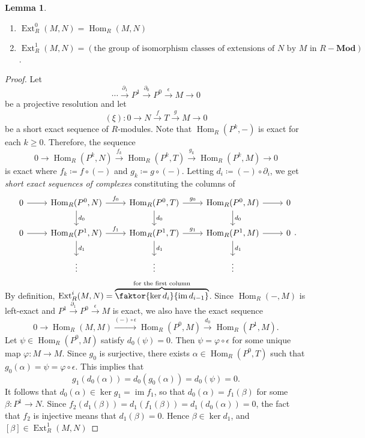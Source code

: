 \documentclass[10pt,letterpaper,cm]{nupset}
\theoremstyle{definition}
\theoremstyle{theorem}
\newtheorem{lemma}[definition]{Lemma}
\theoremstyle{remark}
\newcommand{\1}{\mathbf{1}}
\newcommand{\0}{\vec 0}
\DeclareMathOperator{\ext}{Ext}
\DeclareMathOperator{\im}{im}
\DeclareMathOperator{\Hom}{Hom}
\begin{document}
\begin{lemma} $ $
\begin{enumerate}
\item $\ext^0_R(M, N) = \Hom_R(M, N)$
\item $\ext^1_R(M, N) = \left( \text{the group of isomorphism classes of extensions of } N \text{ by } M\text{ in } R{-}\mathbf{Mod}    \right)$.
\end{enumerate}                                                                                                \end{lemma}
\begin{proof}
Let $$\cdots \overset{\partial_1}{\longrightarrow} P^1 \overset{\partial_0}{\longrightarrow} P^0  \overset{\epsilon}{\longrightarrow} M \to 0$$ be a projective resolution and
let $$\left(\xi\right) : 0 \to N \overset{f}{\longrightarrow} T \overset{g}{\longrightarrow} M \to 0$$ be a short exact sequence of $R$-modules.
Note that $\Hom_R(P^k, -)$ is exact for each $k\geq 0$. Therefore, the sequence $$ 0 \to \Hom_R(P^k, N) \overset{f_k}{\longrightarrow} \Hom_R(P^k, T) \overset{g_k}{\longrightarrow} \Hom_R(P^k, M) \to 0   $$ is exact where $f_k \coloneqq  f\circ (-)$ and $g_k \coloneqq  g \circ (-)$. Letting $d_i \coloneqq  (-)\circ \partial_i$, we get \textit{short exact sequences of complexes} constituting the columns of 
\[
\begin{tikzcd}
0 \arrow[r] & {\Hom_R(P^0, N)} \arrow[r, "f_0"] \arrow[d, "d_0"] & {\Hom_R(P^0, T)} \arrow[r, "g_0"] \arrow[d, "d_0"] & {\Hom_R(P^0, M)} \arrow[r] \arrow[d, "d_0"] & 0 \\
0 \arrow[r] & {\Hom_R(P^1, N)} \arrow[r, "f_1"] \arrow[d, "d_1"] & {\Hom_R(P^1, T)} \arrow[r, "g_1"] \arrow[d, "d_1"] & {\Hom_R(P^1, M)} \arrow[r] \arrow[d, "d_1"] & 0 \\
 & \vdots & \vdots & \vdots & 
\end{tikzcd}
.\]
By definition, $\ext_R^i(M, N) = \overbrace{\faktor{\ker{d_i}}{\im{d_{i-1}}}}^{\text{for the first column}}$. Since $\Hom_R(-, M)$ is left-exact and $P^1 \overset{\partial_1}{\longrightarrow} P^0 \overset{\epsilon}{\longrightarrow} M$ is exact, we also have the exact sequence $$ 0 \to \Hom_R(M, M) \overset{(-) \circ \epsilon}{\longrightarrow} \Hom_R(P^0, M) \overset{d_0}{\longrightarrow} \Hom_R(P^1, M) .  $$ 
Let $\psi \in \Hom_R(P^0, M)$ satisfy $d_0(\psi) =0$. Then $\psi = \varphi \circ \epsilon$ for some unique map $\varphi : M\to M$. Since $g_0$ is surjective, there exists $\alpha \in \Hom_R(P^0, T)$ such that $g_0(\alpha) = \psi = \varphi \circ \epsilon $. This implies that $$g_1(d_0(\alpha)) = d_0(g_0(\alpha)) = d_0(\psi) =0.$$ It follows that $d_0(\alpha) \in \ker{g_1} = \im{f_1}$, so that $d_0(\alpha) = f_1(\beta)$ for some $\beta : P^1 \to N$. Since $f_2(d_1(\beta))=d_1(f_1(\beta))= d_1(d_0(\alpha)) = 0$, the fact that $f_2$ is injective means that $d_1(\beta) =0$. Hence $\beta \in \ker{d_1}$, and $\left[\beta\right] \in \ext^1_R(M, N)$ 

\end{proof}
\end{document}

